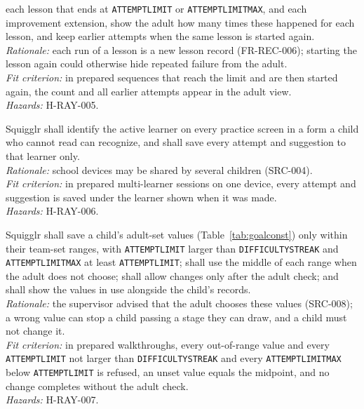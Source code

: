 \documentclass[12pt]{article}
\renewcommand{\_}{\textunderscore\allowbreak}%
\begin{document}
\begin{description}
each lesson that ends at \texttt{ATTEMPT\_LIMIT} or
\texttt{ATTEMPT\_LIMIT\_MAX}, and each improvement extension, show the adult how
many times these happened for each lesson, and keep earlier attempts when the
same lesson is started again.\\
\emph{Rationale:} each run of a lesson is a new lesson record (FR-REC-006);
starting the lesson again could otherwise hide repeated failure from the
adult.\\
\emph{Fit criterion:} in prepared sequences that reach the limit and are then
started again, the count and all earlier attempts appear in the adult view.\\
\emph{Hazards:} H-RAY-005.
\item[SAF-RAY-007]\label{req:SAF-RAY-007} Squigglr shall identify
the active learner on every practice screen in a form a child who cannot read
can recognize, and shall save every attempt and suggestion to that learner
only.\\
\emph{Rationale:} school devices may be shared by several children (SRC-004).\\
\emph{Fit criterion:} in prepared multi-learner sessions on one device, every
attempt and suggestion is saved under the learner shown when it was made.\\
\emph{Hazards:} H-RAY-006.
\item[SAF-RAY-008]\label{req:SAF-RAY-008} Squigglr shall save a
child's adult-set values (Table~\ref{tab:goalconst}) only within their team-set
ranges, with \texttt{ATTEMPT\_LIMIT} larger than \texttt{DIFFICULTY\_STREAK} and
\texttt{ATTEMPT\_LIMIT\_MAX} at least \texttt{ATTEMPT\_LIMIT}; shall use the
middle of each range when the adult does not choose; shall allow changes only
after the adult check; and shall show the values in use alongside the child's
records.\\
\emph{Rationale:} the supervisor advised that the adult chooses these values
(SRC-008); a wrong value can stop a child passing a stage they can draw, and a
child must not change it.\\
\emph{Fit criterion:} in prepared walkthroughs, every out-of-range value and
every \texttt{ATTEMPT\_LIMIT} not larger than \texttt{DIFFICULTY\_STREAK} and
every \texttt{ATTEMPT\_LIMIT\_MAX} below \texttt{ATTEMPT\_LIMIT} is refused, an
unset value equals the midpoint, and no change completes without the adult
check.\\
\emph{Hazards:} H-RAY-007.


\end{description}
\end{document}
